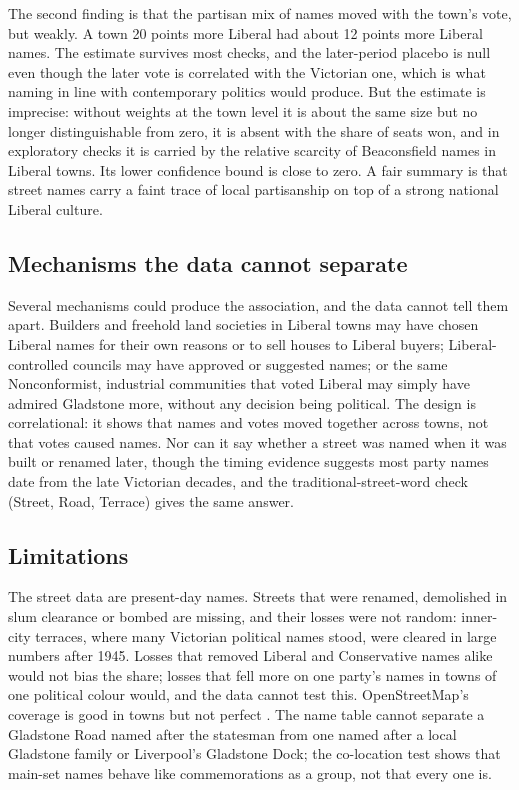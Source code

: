 \documentclass[11pt,a4paper]{article}
\begin{document}
The second finding is that the partisan mix of names moved with the town's vote, but weakly. A town 20 points more Liberal had about 12 points more Liberal names. The estimate survives most checks, and the later-period placebo is null even though the later vote is correlated with the Victorian one, which is what naming in line with contemporary politics would produce. But the estimate is imprecise: without weights at the town level it is about the same size but no longer distinguishable from zero, it is absent with the share of seats won, and in exploratory checks it is carried by the relative scarcity of Beaconsfield names in Liberal towns. Its lower confidence bound is close to zero. A fair summary is that street names carry a faint trace of local partisanship on top of a strong national Liberal culture.

\subsection{Mechanisms the data cannot separate}
Several mechanisms could produce the association, and the data cannot tell them apart. Builders and freehold land societies in Liberal towns may have chosen Liberal names for their own reasons or to sell houses to Liberal buyers; Liberal-controlled councils may have approved or suggested names; or the same Nonconformist, industrial communities that voted Liberal may simply have admired Gladstone more, without any decision being political. The design is correlational: it shows that names and votes moved together across towns, not that votes caused names. Nor can it say whether a street was named when it was built or renamed later, though the timing evidence suggests most party names date from the late Victorian decades, and the traditional-street-word check (Street, Road, Terrace) gives the same answer.

\subsection{Limitations}
The street data are present-day names. Streets that were renamed, demolished in slum clearance or bombed are missing, and their losses were not random: inner-city terraces, where many Victorian political names stood, were cleared in large numbers after 1945. Losses that removed Liberal and Conservative names alike would not bias the share; losses that fell more on one party's names in towns of one political colour would, and the data cannot test this. OpenStreetMap's coverage is good in towns but not perfect \citep{haklay2010}. The name table cannot separate a Gladstone Road named after the statesman from one named after a local Gladstone family or Liverpool's Gladstone Dock; the co-location test shows that main-set names behave like commemorations as a group, not that every one is.
\end{document}
